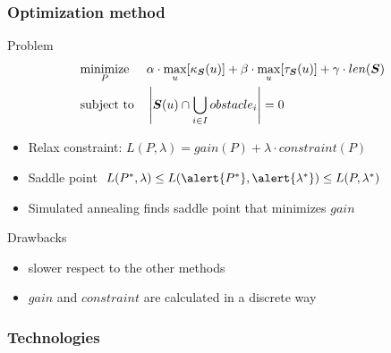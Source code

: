 \begin{frame}
  \frametitle{Optimization method}
  \begin{block}{Problem}
    \begin{equation*}
      \begin{aligned}
        & \underset{P}{\text{minimize}}
        & & \alpha\cdot \max_u[\kappa_{\boldsymbol{S}}(u)]+\beta\cdot
        \max_u[\tau_{\boldsymbol{S}}(u)]+\gamma\cdot len(\boldsymbol{S}) \\
        & \text{subject to}
        & & \left|\boldsymbol{S}(u)\cap \bigcup_{i\in I}obstacle_i\right| = 0
      \end{aligned}
    \end{equation*}\pause
  \end{block}
  \begin{itemize}
  \item \alert{Relax} constraint: $L(P,\lambda)=gain(P)+\lambda\cdot constraint(P)$\pause
  \item \alert{Saddle} point $L(P^*,\lambda)\leq L(\alert{P^*},
    \alert{\lambda^*})\leq L(P,\lambda^*)$\pause
  \item \alert{Simulated annealing} finds saddle point that minimizes $gain$\pause
  \end{itemize}
  \begin{block}{Drawbacks}
    \begin{itemize}
    \item[\xmark] \alert{slower} respect to the other methods\pause
    \item[\xmark] $gain$ and $constraint$ are calculated in a
      \alert{discrete} way
    \end{itemize}
  \end{block}
\end{frame}

\begin{frame}
  \frametitle{Technologies}
  \begin{center}
    \\[0.5cm]
    \\[0.5cm]
    \\[0.5cm]
  \end{center}
\end{frame}

